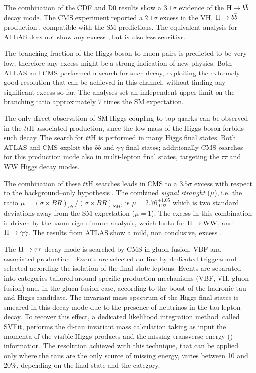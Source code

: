 The combination of the CDF and D0 results \cite{Aaltonen:2012qt} show a $3.1\sigma$ evidence of the $\mathrm{H} \rightarrow b \overline{b}$ decay mode. The CMS experiment reported a $2.1\sigma$ excess in the VH, $\mathrm{H} \rightarrow b \overline{b}$ production \cite{Chatrchyan:2013zna}, compatible with the SM predictions. The equivalent analysis for ATLAS does not show any excess \cite{TheATLAScollaboration:2013lia}, but is also less sensitive.

The branching fraction of the Higgs boson to muon pairs is predicted to be very low, therefore any excess might be a strong indication of new physics. Both ATLAS \cite{Aad:2014xva} and CMS \cite{CMS:2013aga} performed a search for such decay, exploiting the extremely good resolution that can be achieved in this channel, without finding any significant excess so far. The analyses set an independent upper limit on the branching ratio approximately 7 times the SM expectation.

The only direct observation of SM Higgs coupling to top quarks can be observed in the $tt$H associated production, since the low mass of the Higgs boson forbids such decay. The search for $tt$H is performed in many Higgs final states. Both ATLAS and CMS exploit the $b\bar{b}$ and $\gamma\gamma$ final states; additionally CMS searches for this production mode also in multi-lepton final states, targeting the $\tau\tau$ and WW Higgs decay modes.

The combination of these $tt$H searches leads in CMS to a $3.5\sigma$ excess with respect to the background--only hypothesis \cite{CMS:2014ega}. The combined \emph{signal stranght} ($\mu$), i.e. the ratio $\mu = (\sigma \times BR)_{obs} / (\sigma \times BR)_{SM}$, is $\mu = 2.76^{+1.05}_{0.92}$ which is two standard deviations away from the SM expectation ($\mu = 1$). The excess in this combination is driven by the same--sign dimuon analysis, which looks for $\mathrm{H}\rightarrow \mathrm{W}\mathrm{W}$, and $\mathrm{H}\rightarrow\gamma\gamma$. The results from ATLAS show a mild, non conclusive, excess \cite{ATLASCONF:2014043}.

The $\mathrm{H} \to \tau \tau$ decay mode is searched by CMS in gluon fusion, VBF and associated production \cite{H_tautau}. Events are selected on--line by dedicated triggers and selected according the isolation of the final state leptons. Events are separated into categories tailored around specific production mechanisms (VBF, VH, gluon fusion) and, in the gluon fusion case, according to the boost of the hadronic tau and Higgs candidate. The invariant mass spectrum of the Higgs final states is smeared in this decay mode due to the presence of neutrinos in the tau lepton decay. To recover this effect, a dedicated likelihood integration method, called SVFit, performs the di-tau invariant mass calculation taking as input the momenta of the visible Higgs products and the missing transverse energy (\MET) information. The resolution achieved with this technique, that can be applied only where the taus are the only source of missing energy, varies between 10 and 20\%, depending on the final state and the category.

